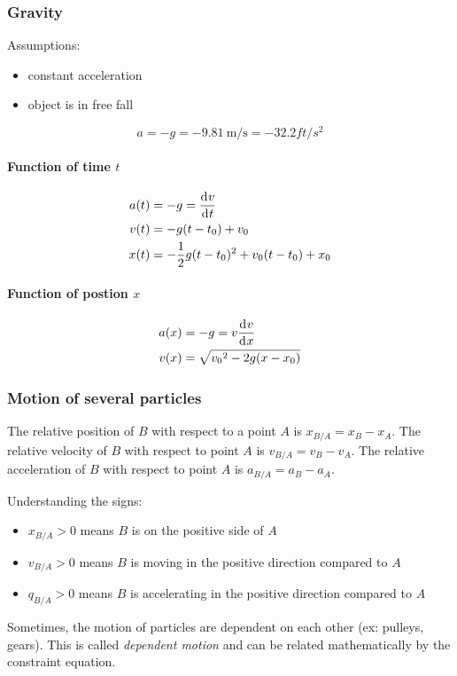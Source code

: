 \documentclass[10pt, twocolumn]{article}
\begin{document}
\subsubsection{Gravity}
Assumptions:
\begin{itemize}
  \item constant acceleration
  \item object is in free fall
\end{itemize}
\[
  a = -g = -\SI{9.81}{\metre\per\second} = -32.2 ft/s^2
\]

\paragraph{Function of time \(t\)}
\begin{align*}
  a(t) & = -g = \frac{\mathrm{d}^{} v}{\mathrm{d}^{} t}                          \\
  v(t) & = -g(t - t_0) + v_0                               \\
  x(t) & = -\frac{1}{2} g (t - t_0)^2 + v_0(t - t_0) + x_0
\end{align*}

\paragraph{Function of postion \(x\)}
\begin{align*}
  a(x) & = -g = v \frac{\mathrm{d}^{} v}{\mathrm{d}^{} x}     \\
  v(x) & = \sqrt{{v_0}^2 - 2g(x - x_0)}
\end{align*}


\subsubsection{Motion of several particles}
The relative position of \(B\) with respect to a point \(A\) is \(x_{B/A} = x_B - x_A\).
The relative velocity of \(B\) with respect to point \(A\) is \(v_{B/A} = v_B - v_A\).
The relative acceleration of \(B\) with respect to point \(A\) is \(a_{B/A} = a_B - a_A\).

\begin{remark}
  Understanding the signs:
  \begin{itemize}
    \item \(x_{B/A} > 0\) means \(B\) is on the positive side of \(A\)
    \item \(v_{B/A} > 0\) means \(B\) is moving in the positive direction compared to \(A\)
    \item \(q_{B/A} > 0\) means \(B\) is accelerating in the positive direction compared to \(A\)
  \end{itemize}
\end{remark}
Sometimes, the motion of particles are dependent on each other (ex: pulleys, gears).
This is called \emph{dependent motion} and can be related mathematically by the constraint equation.
\end{document}
